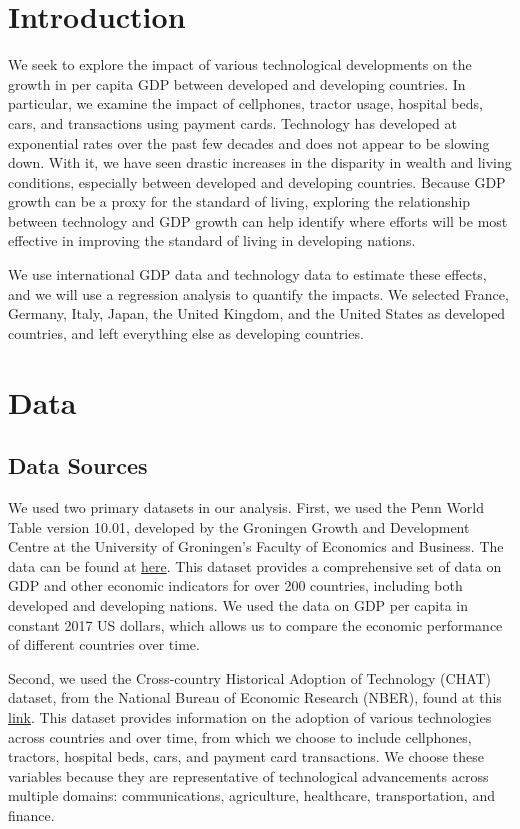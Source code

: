 \documentclass[11pt]{texMemo}
\begin{document}
\maketitle

\section{Introduction}
We seek to explore the impact of various technological developments on the growth in per capita GDP between developed and developing countries.
In particular, we examine the impact of cellphones, tractor usage, hospital beds, cars, and transactions using payment cards.
Technology has developed at exponential rates over the past few decades and does not appear to be slowing down.
With it, we have seen drastic increases in the disparity in wealth and living conditions, especially between developed and developing countries.
Because GDP growth can be a proxy for the standard of living, exploring the relationship between technology and GDP growth can help identify where efforts will be most effective in improving the standard of living in developing nations.

We use international GDP data and technology data to estimate these effects, and we will use a regression analysis to quantify the impacts.
We selected France, Germany, Italy, Japan, the United Kingdom, and the United States as developed countries, and left everything else as developing countries.

\section{Data}
\subsection{Data Sources}
We used two primary datasets in our analysis.
First, we used the Penn World Table version 10.01, developed by the Groningen Growth and Development Centre at the University of Groningen's Faculty of Economics and Business.
The data can be found at \href{https://www.rug.nl/ggdc/productivity/pwt/}{here}.
This dataset provides a comprehensive set of data on GDP and other economic indicators for over 200 countries, including both developed and developing nations.
We used the data on GDP per capita in constant 2017 US dollars, which allows us to compare the economic performance of different countries over time.

Second, we used the Cross-country Historical Adoption of Technology (CHAT) dataset, from the National Bureau of Economic Research (NBER), found at this \href{https://data.nber.org/data-appendix/w15319/}{link}.
This dataset provides information on the adoption of various technologies across countries and over time, from which we choose to include cellphones, tractors, hospital beds, cars, and payment card transactions.
We choose these variables because they are representative of technological advancements across multiple domains: communications, agriculture, healthcare, transportation, and finance.
\end{document}

